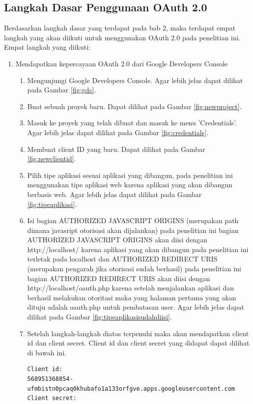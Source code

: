 \subsection{Langkah Dasar Penggunaan OAuth 2.0}
Berdasarkan langkah dasar yang terdapat pada bab 2, maka terdapat empat langkah yang akan diikuti untuk menggunakan OAuth 2.0 pada penelitian ini. Empat langkah yang diikuti:
\begin{enumerate}
\item Mendapatkan kepercayaan OAuth 2.0 dari Google Developers Console\\
    \begin{enumerate}
    \item Mengunjungi Google Developers Console. Agar lebih jelas dapat dilihat pada Gambar \ref{fig:gdc}.
    \item Buat sebuah proyek baru. Dapat dilihat pada Gambar \ref{fig:newproject}.
    \item Masuk ke proyek yang telah dibuat dan masuk ke menu 'Credentials'. Agar lebih jelas dapat dilihat pada Gambar \ref{fig:credentials}.
    \item Membuat client ID yang baru. Dapat dilihat pada Gambar \ref{fig:newclientid}.
    \item Pilih tipe aplikasi sesuai aplikasi yang dibangun, pada penelitian ini menggunakan tipe aplikasi web karena aplikasi yang akan dibangun berbasis web. Agar lebih jelas dapat dilihat pada Gambar \ref{fig:tipeaplikasi}.
    \item Isi bagian AUTHORIZED JAVASCRIPT ORIGINS (merupakan path dimana javasript otorisasi akan dijalankan) pada penelitian ini bagian AUTHORIZED JAVASCRIPT ORIGINS akan diisi dengan http://localhost/ karena aplikasi yang akan dibangun pada penelitian ini terletak pada localhost dan AUTHORIZED REDIRECT URIS (merupakan pengarah jika otorisasi sudah berhasil) pada penelitian ini bagian AUTHORIZED REDIRECT URIS akan diisi dengan http://localhost/oauth.php karena setelah menjalankan aplikasi dan berhasil melakukan otoritasi maka yang halaman pertama yang akan dituju adalah oauth.php untuk pembatasan user. Agar lebih jelas dapat dilihat pada Gambar \ref{fig:tipeaplikasisudahdiisi}.
    \item Setelah langkah-langkah diatas terpenuhi maka akan mendapatkan client id dan client secret. Client id dan client secret yang didapat dapat dilihat di bawah ini.
\begin{lstlisting}
Client id:
568951368854-ufmbistn0pcaq0khubafo1a133orfgve.apps.googleusercontent.com
Client secret:

\end{lstlisting}
\end{enumerate}
\end{enumerate}
